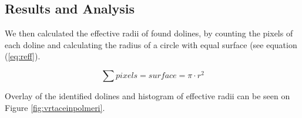 \documentclass[a0,portrait]{a0poster}
\begin{document}
\begin{multicols}{2}

\section*{Results and Analysis}

We then calculated the effective radii of found dolines, by counting the pixels of each doline and calculating the radius of a circle with equal surface (see equation (\ref{eq:reff}).

\begin{equation}
  \sum pixels = surface = \pi \cdot r^2
  \label{eq:reff}
\end{equation}

Overlay of the identified dolines and histogram of effective radii can be seen on Figure \ref{fig:vrtaceinpolmeri}.


\end{multicols}
\end{document}

